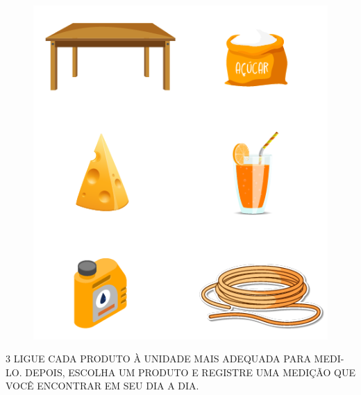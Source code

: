 \begin{figure}[H]
\centering
\includegraphics[width=\textwidth]{./media/SAEB_1ANO_MAT_FIGURA35.png}
\end{figure}


\num{3} LIGUE CADA PRODUTO À UNIDADE MAIS ADEQUADA PARA MEDI-LO.
DEPOIS, ESCOLHA UM PRODUTO E REGISTRE UMA MEDIÇÃO QUE VOCÊ ENCONTRAR
EM SEU DIA A DIA.


